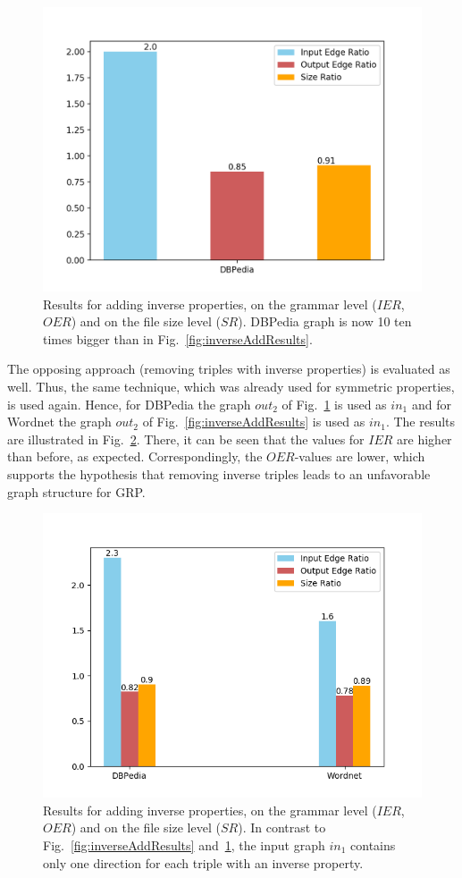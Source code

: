 \begin{figure}
	\centering
	\includegraphics[width=0.8\linewidth]{figures/4_evaluation/ontology/ratiosInverseAddBigger}
	\caption{Results for adding inverse properties, on the grammar level ($IER$, $OER$) and on the file size level ($SR$). DBPedia graph is now 10 ten times bigger than in Fig.~\ref{fig:inverseAddResults}.}
	\label{fig:inverseAddResultsBigger}
\end{figure}


The opposing approach (removing triples with inverse properties) is evaluated as well. Thus, the same technique, which was already used for symmetric properties, is used again. Hence, for DBPedia the graph $out_2$ of Fig.~\ref{fig:inverseAddResultsBigger} is used as $in_1$ and for Wordnet the graph $out_2$ of Fig.~\ref{fig:inverseAddResults} is used as $in_1$. The results are illustrated in Fig.~\ref{fig:inverseAddResults2}. There, it can be seen that the values for $IER$ are higher than before, as expected. Correspondingly, the $OER$-values are lower, which supports the hypothesis that removing inverse triples leads to an unfavorable graph structure for GRP.

\begin{figure}
	\centering
	\includegraphics[width=0.8\linewidth]{figures/4_evaluation/ontology/ratiosInverseAdd2}
	\caption{Results for adding inverse properties, on the grammar level ($IER$, $OER$) and on the file size level ($SR$). In contrast to Fig.~\ref{fig:inverseAddResults} and~\ref{fig:inverseAddResultsBigger}, the input graph $in_1$ contains only one direction for each triple with an inverse property.}
	\label{fig:inverseAddResults2}
\end{figure}


